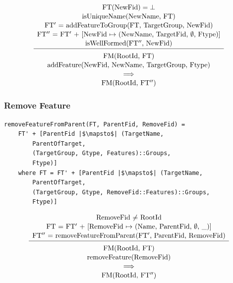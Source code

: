 \documentclass[a4paper,english]{ifimaster}
\begin{document}
\begin{equation*}
\begin{array}{c} 
\text{FT(NewFid)} = \bot \\[1pt]
\text{isUniqueName(NewName, FT)} \\[1pt]
\text{FT$'$ = addFeatureToGroup(FT, TargetGroup, NewFid)} \\[1pt]
\text{FT$''$ = FT$'$ + [NewFid $\mapsto$ (NewName, TargetFid, $\emptyset$, Ftype)]}\\[1pt]
\text{isWellFormed(FT$''$, NewFid)} \\[1pt]
\hline\\[-7pt]
\text{FM(RootId, FT)} \\[1pt]
\text{addFeature(NewFid, NewName, TargetGroup, Ftype)}  \\[1pt]
\implies \\[1pt]
\text{FM(RootId, FT$''$)}
\end{array} 
\end{equation*}

\subsubsection*{Remove Feature}
\begin{verbatim}
removeFeatureFromParent(FT, ParentFid, RemoveFid) =
    FT' + [ParentFid |$\mapsto$| (TargetName,
        ParentOfTarget,
        (TargetGroup, Gtype, Features)::Groups,
        Ftype)]
    where FT = FT' + [ParentFid |$\mapsto$| (TargetName,
        ParentOfTarget, 
        (TargetGroup, Gtype, RemoveFid::Features)::Groups,
        Ftype)]
\end{verbatim}

\begin{equation*}
\begin{array}{c} 
\text{RemoveFid $\neq$ RootId} \\[1pt]
\text{FT = FT$'$ + [RemoveFid $\mapsto$ (Name, ParentFid, $\emptyset$, \_)]} \\[1pt]
\text{FT$''$ = removeFeatureFromParent(FT$'$, ParentFid, RemoveFid)} \\[1pt]
\hline\\[-7pt]
\text{FM(RootId, FT)} \\[1pt]
\text{removeFeature(RemoveFid)}  \\[1pt]
\implies \\[1pt]
\text{FM(RootId, FT$''$)}
\end{array} 
\end{equation*}
\end{document}
